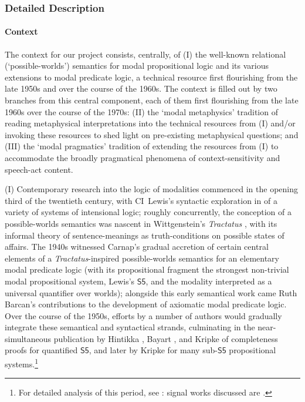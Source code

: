 \documentclass[12pt]{article}
\begin{document}




\subsubsection*{Detailed Description}


\paragraph{Context} The context for our project consists, centrally, of (I) the
well-known relational (`possible-worlds') semantics for modal propositional
logic and its various extensions to modal predicate logic, a technical
resource first flourishing from the late 1950s and over the course of the
1960s. The context is filled out by two branches from this central component,
each of them first flourishing from the late 1960s over the course of the
1970s: (II) the `modal metaphysics' tradition of reading metaphysical
interpretations into the technical resources from (I) and/or invoking these
resources to shed light on pre-existing metaphysical questions; and (III) the
`modal pragmatics' tradition of extending the resources from (I) to
accommodate the broadly pragmatical phenomena of context-sensitivity and
speech-act content.

\smallskip{}

(I) Contemporary research into the logic of modalities commenced in the
opening third of the twentieth century, with CI~Lewis's syntactic exploration
in \citep{lewislangford32} of a variety of systems of intensional logic;
roughly concurrently, the conception of a possible-worlds semantics was
nascent in Wittgenstein's \emph{Tractatus} \citep{witttlp}, with its informal
theory of sentence-meanings as truth-conditions on possible states of affairs.
The 1940s witnessed Carnap's gradual accretion
\citep{carnapis,carnap46,carnapmn} of certain central elements of a
\emph{Tractatus}-inspired possible-worlds semantics for an elementary modal
predicate logic (with its propositional fragment the strongest non-trivial
modal propositional system, Lewis's $\mathsf{S5}$, and the modality
interpreted as a universal quantifier over worlds); alongside this early
semantical work came Ruth Barcan's \citep{barcan46b,barcan46a,barcan47}
contributions to the development of axiomatic modal predicate logic.
Over the course of the 1950s, efforts by a number of authors would
gradually integrate these semantical and syntactical strands, culminating
in the near-simultaneous publication by Hintikka \citep{hintikka},
Bayart \citep{Bayart1959-BAYQDL}, and Kripke \citep{kripke59} of
completeness proofs for quantified $\mathsf{S5}$, and later by Kripke
\citep{Kripke1963-KRISAO} for many sub-$\mathsf{S5}$ propositional
systems.\footnote{For detailed analysis of this period, see
\citep{copeland02}: signal works discussed are
\citep{McKinsey1948-MCKSTA,jonsson-tarski,jonsson-tarski-2,vonwright53,meredithprior56,montague60,kripke59,kripke63,Hintikka1961-HINMAQ,Lemmon1966-LEMASF-3}.}
\end{document}
